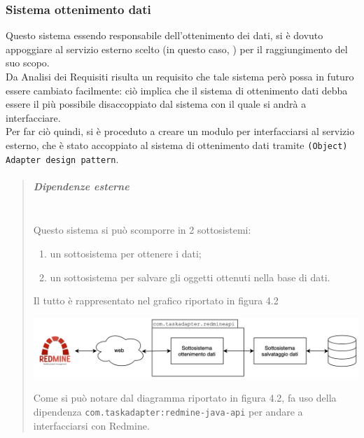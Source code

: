         \subsubsection{Sistema ottenimento dati}
            Questo sistema essendo responsabile dell'ottenimento dei dati, si è dovuto appoggiare al servizio esterno scelto (in questo caso, ) per il raggiungimento del suo scopo. \\
            Da Analisi dei Requisiti risulta un requisito che tale sistema però possa in futuro essere cambiato facilmente: ciò implica che il sistema di ottenimento dati debba essere il più possibile disaccoppiato dal sistema con il quale si andrà a interfacciare. \\
            Per far ciò quindi, si è proceduto a creare un modulo per interfacciarsi al servizio esterno, che è stato accoppiato al sistema di ottenimento dati tramite \texttt{(Object) Adapter design pattern}.
            \begin{quote}
            	\mbox{}%
            	\vspace{-1cm}
                   
                    \subparagraph*{Dipendenze esterne}
                    \mbox{} \\
                        Questo sistema si può scomporre in 2 sottosistemi:
                        \begin{enumerate}
                            \item un sottosistema per ottenere i dati;
                            \item un sottosistema per salvare gli oggetti ottenuti nella base di dati.
                        \end{enumerate}
                        Il tutto è rappresentato nel grafico riportato in figura 4.2
                        \begin{center}
                            \includegraphics[keepaspectratio = true, width=14cm]{immagini/progettazione/ottenimento.png}
                        \end{center}
                        Come si può notare dal diagramma riportato in figura 4.2, fa uso della dipendenza \texttt{com.taskadapter:redmine-java-api} per andare a interfacciarsi con Redmine.
            \end{quote}
